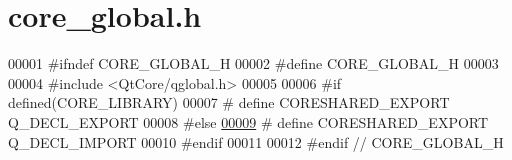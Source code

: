 \hypertarget{a00017_source}{}\section{core\+\_\+global.\+h}
\label{a00017_source}

\begin{DoxyCode}
00001 \textcolor{preprocessor}{#}\textcolor{preprocessor}{ifndef} \textcolor{preprocessor}{CORE\_GLOBAL\_H}
00002 \textcolor{preprocessor}{#}\textcolor{preprocessor}{define} \textcolor{preprocessor}{CORE\_GLOBAL\_H}
00003 
00004 \textcolor{preprocessor}{#}\textcolor{preprocessor}{include} \textcolor{preprocessor}{<}\textcolor{preprocessor}{QtCore}\textcolor{preprocessor}{/}\textcolor{preprocessor}{qglobal}\textcolor{preprocessor}{.}\textcolor{preprocessor}{h}\textcolor{preprocessor}{>}
00005 
00006 \textcolor{preprocessor}{#}\textcolor{preprocessor}{if} \textcolor{preprocessor}{defined}\textcolor{preprocessor}{(}\textcolor{preprocessor}{CORE\_LIBRARY}\textcolor{preprocessor}{)}
00007 \textcolor{preprocessor}{#}  \textcolor{preprocessor}{define} \textcolor{preprocessor}{CORESHARED\_EXPORT} \textcolor{preprocessor}{Q\_DECL\_EXPORT}
00008 \textcolor{preprocessor}{#}\textcolor{preprocessor}{else}
\hyperlink{a00017_a35b4f560a49976697e57858385e52c17}{00009} \textcolor{preprocessor}{#}  \textcolor{preprocessor}{define} \textcolor{preprocessor}{CORESHARED\_EXPORT} \textcolor{preprocessor}{Q\_DECL\_IMPORT}
00010 \textcolor{preprocessor}{#}\textcolor{preprocessor}{endif}
00011 
00012 \textcolor{preprocessor}{#}\textcolor{preprocessor}{endif} \textcolor{comment}{// CORE\_GLOBAL\_H}
\end{DoxyCode}
